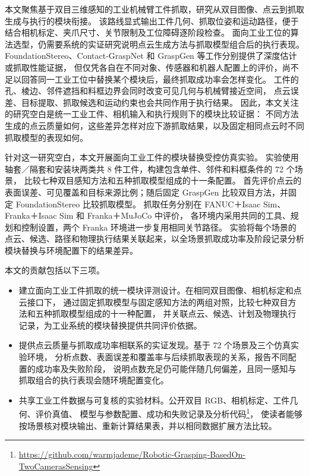 \documentclass[UTF8,fontset=fandol,a4paper,11pt]{ctexart}
\begin{document}
本文聚焦基于双目三维感知的工业机械臂工件抓取，研究从双目图像、点云到抓取生成与执行的模块衔接。
该路线显式输出工件几何、抓取位姿和运动路径，便于结合相机标定、夹爪尺寸、关节限制及工位障碍逐阶段检查。
面向工业工位的算法选型，仍需要系统的实证研究说明点云生成方法与抓取模型组合后的执行表现。
FoundationStereo、Contact-GraspNet 和 GraspGen 等工作分别提供了深度估计或抓取性能证据\cite{wen2025,sundermeyer2021,murali2026}，
但仅凭各自在不同对象、传感器和机器人配置上的评价，尚不足以回答同一工业工位中替换某个模块后，最终抓取成功率会怎样变化。
工件的孔、棱边、邻件遮挡和料框边界会同时改变可见几何与机械臂接近空间，
点云误差、目标提取、抓取候选和运动约束也会共同作用于执行结果。
因此，本文关注的研究空白是统一工业工件、相机输入和执行规则下的模块比较证据：
不同方法生成的点云质量如何，这些差异怎样对应下游抓取结果，以及固定相同点云时不同抓取模型的表现如何。

针对这一研究空白，本文开展面向工业工件的模块替换受控仿真实验。
实验使用轴套／隔套和安装块两类共 8 件工件，构建包含单件、邻件和料框条件的 72 个场景，
比较七种双目感知方法和五种抓取模型组成的十一条配置。
首先评价点云的表面误差、可见覆盖和目标来源比例；随后固定 GraspGen 比较双目方法，并固定 FoundationStereo 比较抓取模型。
抓取任务分别在 FANUC＋Isaac Sim、Franka＋Isaac Sim 和 Franka＋MuJoCo 中评价，
各环境内采用共同的工具、规划和控制设置，两个 Franka 环境进一步复用相同关节路径。
实验将每个场景的点云、候选、路径和物理执行结果关联起来，以全场景抓取成功率及阶段记录分析模块替换与环境配置下的结果差异。

本文的贡献包括以下三项。
\begin{itemize}
\item 建立面向工业工件抓取的统一模块评测设计。在相同双目图像、相机标定和点云接口下，
通过固定抓取模型与固定感知方法的两组对照，比较七种双目方法和五种抓取模型组成的十一种配置，
并关联点云、候选、计划及物理执行记录，为工业系统的模块替换提供共同评价依据。
\item 提供点云质量与抓取成功率相联系的实证发现。基于 72 个场景及三个仿真实验环境，
分析点数、表面误差和覆盖率与后续抓取表现的关系，报告不同配置的成功率及失败阶段，
说明点数充足仍可能伴随几何偏差，且同一感知与抓取组合的执行表现会随环境配置变化。
\item 共享工业工件数据与可复核的实验材料。公开双目 RGB、相机标定、工件几何、评价真值、
模型与参数配置、成功和失败记录及分析代码\footnote{\url{https://github.com/warmjademe/Robotic-Grasping-BasedOn-TwoCamerasSensing}}，
使读者能够按场景核对模块输出、重新计算结果表，并以相同数据扩展方法比较。
\end{itemize}
\end{document}
